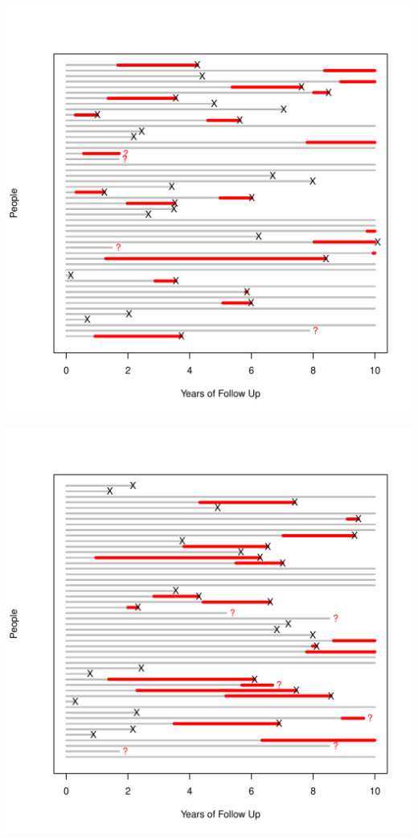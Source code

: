 \documentclass{article}\usepackage{graphicx, color}
\newenvironment{knitrout}{}{} %
\begin{document}
\begin{knitrout}
\color{fgcolor}\includegraphics[width=6in]{figure/four} 
\end{knitrout}


\begin{knitrout}
\color{fgcolor}\includegraphics[width=6in]{figure/five} 
\end{knitrout}
\end{document}
